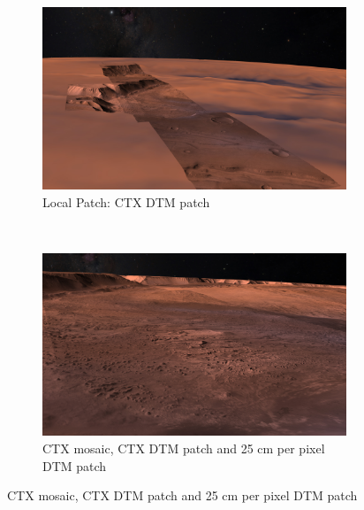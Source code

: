 \begin{figure}[h]
    \centering
    \begin{subfigure}[t]{0.45\textwidth}
        \includegraphics[width=\textwidth]{figures/results/screenshots_thesis_old/west_candor_chasma1.jpg}
        \caption{Local Patch: CTX DTM patch}
    \end{subfigure}
    ~
    \begin{subfigure}[t]{0.45\textwidth}
        \includegraphics[width=\textwidth]{figures/results/screenshots_thesis_old/west_candor_chasma2.jpg}
        \caption{CTX mosaic, CTX DTM patch and 25 cm per pixel DTM patch}
    \end{subfigure}
    

\end{figure}
